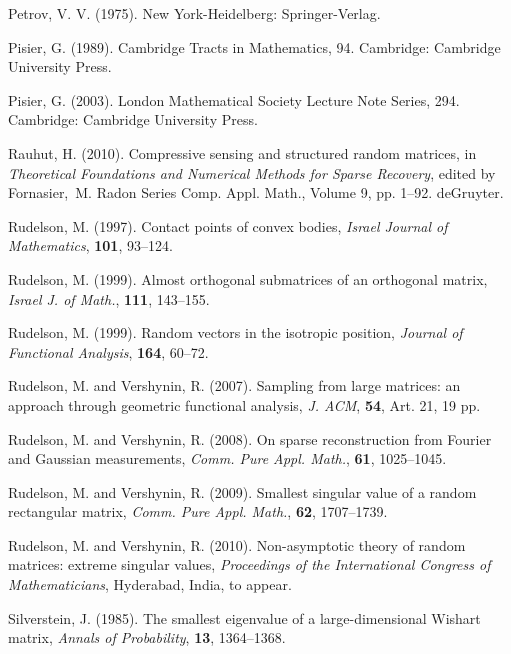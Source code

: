 \documentclass[10pt, openany]{book}
\theoremstyle{remark}
\begin{document}
\begin{thebibliography}{}
 Petrov, V. V. (1975).
   New York-Heidelberg: Springer-Verlag.
   
 Pisier, G. (1989).
  Cambridge Tracts in Mathematics, 94. 
  Cambridge: Cambridge University Press.

 Pisier, G. (2003).
  London Mathematical Society Lecture Note Series, 294. 
  Cambridge: Cambridge University Press.
  
 Rauhut, H. (2010). 
  \newblock Compressive sensing and structured random matrices,
  in {\em Theoretical Foundations and Numerical Methods for Sparse Recovery},  
  edited by Fornasier,~M. 
  Radon Series Comp. Appl. Math., Volume 9, pp. 1--92. deGruyter.

 Rudelson, M. (1997).
  \newblock Contact points of convex bodies,
  {\em Israel Journal of Mathematics}, {\bf 101}, 93--124. 
  
 Rudelson, M. (1999).
  \newblock Almost orthogonal submatrices of an orthogonal matrix,  
  {\em Israel J. of Math.}, {\bf 111}, 143--155.

 Rudelson, M. (1999).
  \newblock Random vectors in the isotropic position, 
  {\em Journal of Functional Analysis}, {\bf 164}, 60--72. 
  
 Rudelson, M. and Vershynin, R. (2007).
  \newblock Sampling from large matrices: an approach through geometric functional analysis,
  {\em J. ACM}, {\bf 54}, Art. 21, 19 pp. 
  
 Rudelson, M. and Vershynin, R. (2008).
  \newblock On sparse reconstruction from Fourier and Gaussian measurements,
  {\em Comm. Pure Appl. Math.}, {\bf 61}, 1025--1045. 

 Rudelson, M. and Vershynin, R. (2009).
  \newblock Smallest singular value of a random rectangular matrix,
  {\em Comm. Pure Appl. Math.}, {\bf 62}, 1707--1739.

 Rudelson, M. and Vershynin, R. (2010).
  \newblock Non-asymptotic theory of random matrices: extreme singular values, 
  {\em Proceedings of the International Congress of Mathematicians}, 
  Hyderabad, India, to appear.

 Silverstein, J. (1985).
  \newblock The smallest eigenvalue of a large-dimensional Wishart matrix,
  {\em Annals of Probability}, {\bf 13}, 1364--1368.
  

\end{thebibliography}
\end{document}
